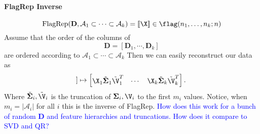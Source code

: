 \paragraph{FlagRep Inverse}
\begin{equation*}
   \text{FlagRep}(\mathbf{D}, \mathcal{A}_1 \subset \cdots \subset \mathcal{A}_k) =  [\![\X]\!] \in \flag(n_1,\dots,n_k;n)
\end{equation*}
Assume that the order of the columns of 
\begin{equation*}
    \mathbf{D} = [\mathbf{D}_1,\cdots,\mathbf{D}_k]
\end{equation*}
are ordered according to $\mathcal{A}_1 \subset \cdots \subset \mathcal{A}_k$ Then we can easily reconstruct our data as
\begin{equation*}
    [\![\X]\!] \mapsto \begin{bmatrix}\X_1 \tilde{\boldsymbol{\Sigma}}_1 \tilde{\V}_1^T & \cdots & \X_k \tilde{\boldsymbol{\Sigma}}_k \tilde{\V}_k^T \end{bmatrix}.
\end{equation*}
Where $\tilde{\boldsymbol{\Sigma}}_i, \tilde{\V}_i$ is the truncation of $\boldsymbol{\Sigma }_i, \V_i$ to the first $m_i$ values. Notice, when $m_i = |\mathcal{A}_i|$ for all $i$ this is the inverse of FlagRep.
\textcolor{blue}{How does this work for a bunch of random $\mathbf{D}$ and feature hierarchies and truncations. How does it compare to SVD and QR?}



